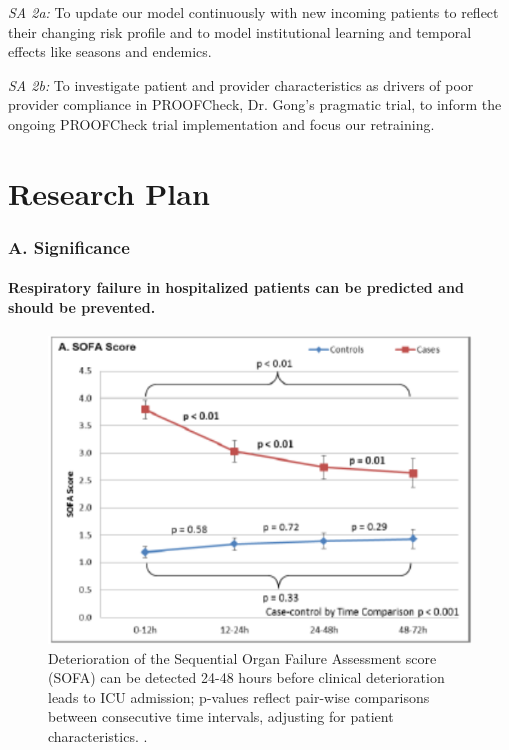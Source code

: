 \documentclass[11pt,notitlepage]{article}
\begin{document}
\textit{SA 2a:} To update our model continuously with new incoming patients to reflect their changing risk profile and to model institutional learning and temporal effects like seasons and endemics. 

\textit{SA 2b:} To investigate patient and provider characteristics as drivers of poor provider compliance in PROOFCheck, Dr. Gong's pragmatic trial, to inform the ongoing PROOFCheck trial implementation and focus our retraining. 


\part*{Research Plan}

\section*{A. Significance}

\subsection*{Respiratory failure in hospitalized patients can be predicted and should be prevented.} 

\begin{figure}
 \vspace{-10pt}
 \includegraphics[scale=0.7]{Figures/SOFA_fig.png}
  \vspace{-25pt}
  \caption{\footnotesize Deterioration of the Sequential Organ Failure Assessment score (SOFA) can be detected 24-48 hours before clinical deterioration leads to ICU admission; p-values reflect pair-wise comparisons between consecutive time intervals, adjusting for patient characteristics. \cite{Yu_24970344}.}
    \label{fig:SOFA_fig}
 \vspace{-15pt}
\end{figure}
\end{document}
